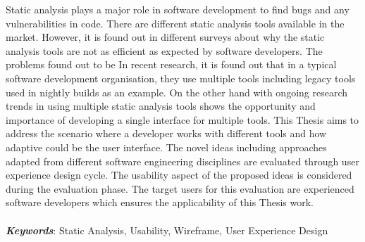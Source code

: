 Static analysis plays a major role in software development to find bugs and any vulnerabilities in code. There are different static analysis tools available in the market. However, it is found out in different surveys about why the static analysis tools are not as efficient as expected by software developers. The problems found out to be  In recent research, it is found out that in a typical software development organisation, they use multiple tools including legacy tools used in nightly builds as an example. On the other hand with ongoing research trends in using multiple static analysis tools shows the opportunity and importance of developing a single interface for multiple tools. This Thesis aims to address the scenario where a developer works with different tools and how adaptive could be the user interface. The novel ideas including approaches adapted from different software engineering disciplines are evaluated through user experience design cycle. The usability aspect of the proposed ideas is considered during the evaluation phase. The target users for this evaluation are experienced software developers which ensures the applicability of this Thesis work. \\ \\
\textbf{\textit{Keywords}}: Static Analysis, Usability, Wireframe, User Experience Design
